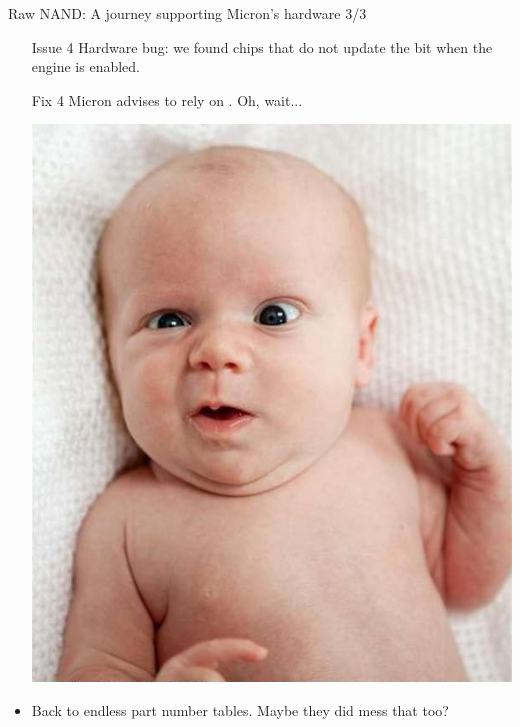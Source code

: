 \documentclass[aspectratio=169,obeyspaces,spaces,hyphens,dvipsnames]{beamer}
\begin{document}
\begin{frame}{Raw NAND: A journey supporting Micron's hardware 3/3}
  \begin{itemize}
  \item [Issue 4] Hardware bug: we found chips that do not update the
     bit when the engine is enabled.
  \item [Fix 4] Micron advises to rely on . Oh,
    wait...
    \begin{center}
      \includegraphics[scale=0.25]{baby-confused.jpg}
    \end{center}
  \item Back to endless part number tables. Maybe they did mess that
    too?
  \end{itemize}
\end{frame}
\end{document}
